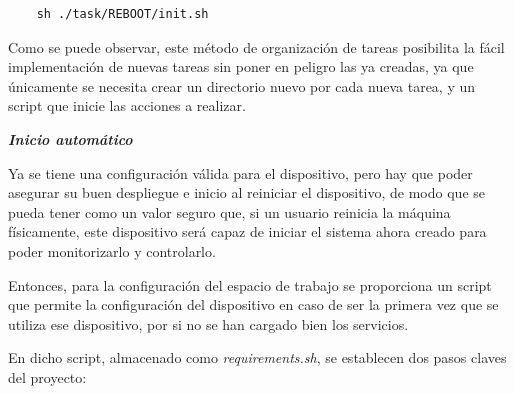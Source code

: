 \begin{lstlisting}
    sh ./task/REBOOT/init.sh
\end{lstlisting}

Como se puede observar, este método de organización de tareas posibilita la fácil implementación de nuevas tareas sin poner en peligro las ya creadas, ya que únicamente se necesita crear un directorio nuevo por cada nueva tarea, y un script que inicie las acciones a realizar.




\textit{\textbf{Inicio automático}}

Ya se tiene una configuración válida para el dispositivo, pero hay que poder asegurar su buen despliegue e inicio al reiniciar el dispositivo, de modo que se pueda tener como un valor seguro que, si un usuario reinicia la máquina físicamente, este dispositivo será capaz de iniciar el sistema ahora creado para poder monitorizarlo y controlarlo.

Entonces, para la configuración del espacio de trabajo se proporciona un script que permite la configuración del dispositivo en caso de ser la primera vez que se utiliza ese dispositivo, por si no se han cargado bien los servicios.

En dicho script, almacenado como \textit{requirements.sh}, se establecen dos pasos claves del proyecto:

